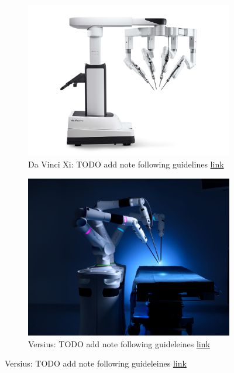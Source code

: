 \begin{figure}
    \centering
    \begin{subfigure}[b]{0.49\textwidth}
        \centering
        \includegraphics[width=\textwidth]{introduction/img/JPG_Large-DV_SYS_Xi_PatientCart_PRF_RGB-min.jpg}
        \caption{Da Vinci Xi: TODO add note following guidelines \href{https://www.intuitive.com/en-gb/about-us/newsroom}{link}}
    \end{subfigure}
    \begin{subfigure}[b]{0.49\textwidth}
        \centering
        \includegraphics[width=\textwidth]{introduction/img/Product-Versius-3-Arm-Setup-B.jpg}
        \caption{Versius: TODO add note following guideleines \href{https://cmrsurgical.com/press-kit?ggt_3867=Versius}{link}}

\end{subfigure}
\end{figure}
